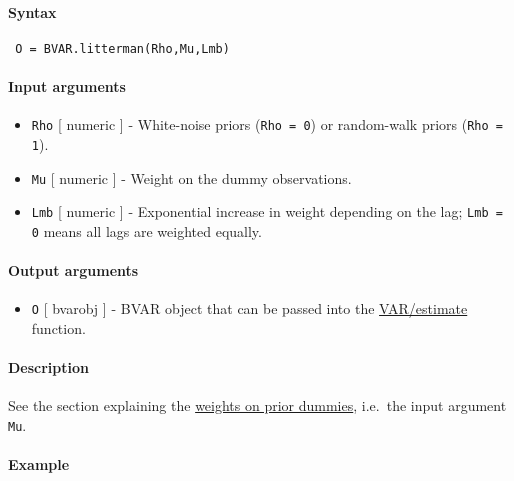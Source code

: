 


	\paragraph{Syntax}
 
 \begin{verbatim}
 O = BVAR.litterman(Rho,Mu,Lmb)
 \end{verbatim}
 
 \paragraph{Input arguments}
 
 \begin{itemize}
 \item
   \texttt{Rho} {[} numeric {]} - White-noise priors (\texttt{Rho = 0})
   or random-walk priors (\texttt{Rho = 1}).
 \item
   \texttt{Mu} {[} numeric {]} - Weight on the dummy observations.
 \item
   \texttt{Lmb} {[} numeric {]} - Exponential increase in weight
   depending on the lag; \texttt{Lmb = 0} means all lags are weighted
   equally.
 \end{itemize}
 
 \paragraph{Output arguments}
 
 \begin{itemize}
 \item
   \texttt{O} {[} bvarobj {]} - BVAR object that can be passed into the
   \url{VAR/estimate} function.
 \end{itemize}
 
 \paragraph{Description}
 
 See the section explaining the \href{BVAR/Contents}{weights on prior
 dummies}, i.e.~the input argument \texttt{Mu}.
 
 \paragraph{Example}


